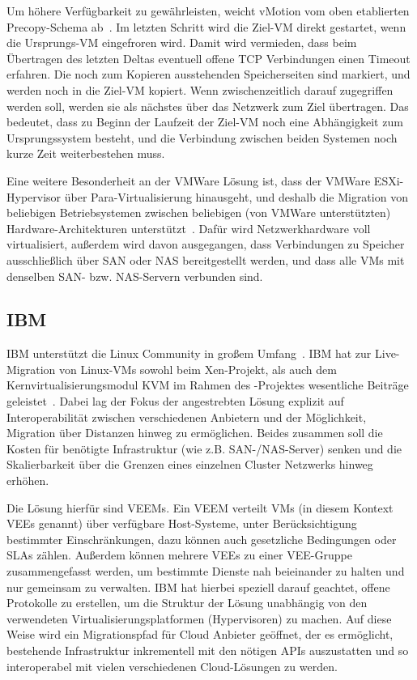 Um höhere Verfügbarkeit zu gewährleisten, weicht vMotion vom oben
etablierten Precopy-Schema ab~\cite{nelson2005fast}. Im letzten
Schritt wird die Ziel-\ac{VM} direkt gestartet, wenn die Ursprungs-\ac{VM}
eingefroren wird. Damit wird vermieden, dass beim Übertragen des
letzten Deltas eventuell offene TCP Verbindungen einen Timeout
erfahren. Die noch zum Kopieren ausstehenden Speicherseiten sind
markiert, und werden noch in die Ziel-\ac{VM} kopiert. Wenn
zwischenzeitlich darauf zugegriffen werden soll, werden sie als
nächstes über das Netzwerk zum Ziel übertragen. Das bedeutet, dass zu
Beginn der Laufzeit der Ziel-\ac{VM} noch eine Abhängigkeit zum
Ursprungssystem besteht, und die Verbindung zwischen beiden Systemen
noch kurze Zeit weiterbestehen muss.

Eine weitere Besonderheit an der VMWare Lösung ist, dass der VMWare
ESXi-Hypervisor über Para-Virtualisierung hinausgeht, und deshalb die
Migration von beliebigen Betriebsystemen zwischen beliebigen (von
VMWare unterstützten) Hardware-Architekturen
unterstützt~\cite{nelson2005fast}. Dafür wird Netzwerkhardware voll
virtualisiert, außerdem wird davon ausgegangen, dass Verbindungen zu
Speicher ausschließlich über \ac{SAN} oder \ac{NAS} bereitgestellt
werden, und dass alle \acp{VM} mit denselben \ac{SAN}-
bzw. \ac{NAS}-Servern verbunden sind.

\subsection{IBM}
IBM unterstützt die Linux Community in großem
Umfang~\cite{kroahhartman2007linux}. IBM hat zur Live-Migration von
Linux-\acp{VM} sowohl beim Xen-Projekt, als auch dem
Kernvirtualisierungsmodul \ac{KVM} im Rahmen des \reservoir-Projektes
wesentliche Beiträge geleistet~\cite{rochwerger2009reservoir}. Dabei
lag der Fokus der angestrebten Lösung explizit auf Interoperabilität
zwischen verschiedenen Anbietern und der Möglichkeit, Migration über
Distanzen hinweg zu ermöglichen. Beides zusammen soll die Kosten für
benötigte Infrastruktur (wie z.B. \ac{SAN}-/\ac{NAS}-Server) senken
und die Skalierbarkeit über die Grenzen eines einzelnen Cluster
Netzwerks hinweg erhöhen.

Die Lösung hierfür sind \acp{VEEM}. Ein \ac{VEEM} verteilt \acp{VM}
(in diesem Kontext \acp{VEE} genannt) über verfügbare Host-Systeme,
unter Berücksichtigung bestimmter Einschränkungen, dazu können
\zB auch gesetzliche Bedingungen oder \acp{SLA} zählen. Außerdem
können mehrere \acp{VEE} zu einer \ac{VEE}-Gruppe zusammengefasst
werden, um bestimmte Dienste nah beieinander zu halten und nur
gemeinsam zu verwalten. IBM hat hierbei speziell darauf geachtet,
offene Protokolle zu erstellen, um die Struktur der Lösung unabhängig
von den verwendeten Virtualisierungsplatformen (\zB Hypervisoren) zu
machen. Auf diese Weise wird ein Migrationspfad für Cloud Anbieter
geöffnet, der es ermöglicht, bestehende Infrastruktur inkrementell mit
den nötigen \acp{API} auszustatten und so interoperabel mit vielen
verschiedenen Cloud-Lösungen zu werden.

